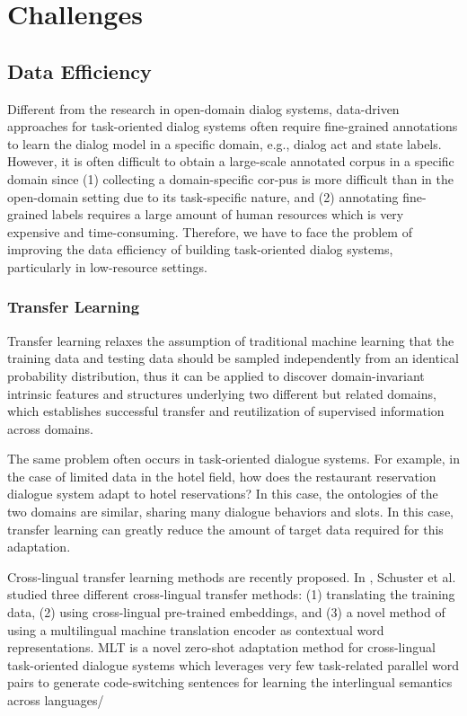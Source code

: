 \documentclass[10pt,twocolumn,letterpaper]{article}
\begin{document}
\section{Challenges}
\subsection{Data Efficiency}

Different from the research in open-domain dialog systems, data-driven approaches for task-oriented dialog systems often require fine-grained annotations to learn the dialog model in a specific domain, e.g., dialog act and state labels. However, it is often difficult to obtain a large-scale annotated corpus in a specific domain since (1) collecting a domain-specific cor-pus is more difficult than in the open-domain setting due to its task-specific nature, and (2) annotating fine-grained labels requires a large amount of human resources which is very expensive and time-consuming. Therefore, we have to face the problem of improving the data efficiency of building task-oriented dialog systems, particularly in low-resource settings.

\subsubsection{Transfer Learning}

Transfer learning relaxes the assumption of traditional machine learning that the training data and testing data should be sampled independently from an identical probability distribution, thus it can be applied to discover domain-invariant intrinsic features and structures underlying two different but related domains, which establishes successful transfer and reutilization of supervised information across domains. 

The same problem often occurs in task-oriented dialogue systems. For example, in the case of limited data in the hotel field, how does the restaurant reservation dialogue system adapt to hotel reservations? In this case, the ontologies of the two domains are similar, sharing many dialogue behaviors and slots. In this case, transfer learning can greatly reduce the amount of target data required for this adaptation.

Cross-lingual transfer learning methods are recently proposed. In \cite{schuster2018cross}, Schuster et al. studied three different cross-lingual transfer methods: (1) translating the training data, (2) using cross-lingual pre-trained embeddings, and (3) a novel method of using a multilingual machine translation encoder as contextual word
representations. MLT \cite{liu2020attention} is a novel zero-shot adaptation method for cross-lingual task-oriented dialogue systems which leverages very few task-related parallel word pairs
to generate code-switching sentences for learning the interlingual semantics across languages/
\end{document}
